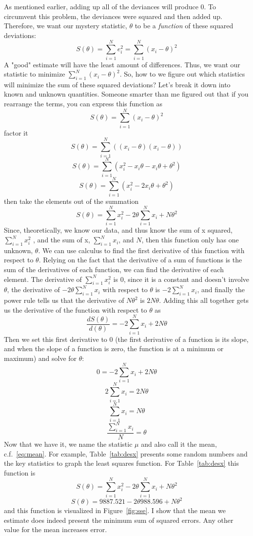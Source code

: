 As mentioned earlier, adding up all of the deviances will produce 0. To circumvent this problem, the deviances were squared and then added up. Therefore, we want our mystery statistic, $\theta$ to be a {\it function} of these squared deviations:
\begin{equation}
S\left(\theta\right)=\sum_{i=1}^{N}e_i^2=\sum_{i=1}^{N}\left(x_i-\theta\right)^2
\end{equation}
A "good" estimate will have the least amount of differences. Thus, we want our statistic to minimize $\sum_{i=1}^{N}\left(x_i-\theta\right)^2$. So, how to we figure out which statistics will minimize the sum of these squared deviations? Let's break it down into known and unknown quantities. Someone smarter than me figured out that if you rearrange the terms, you can express this function as
\[
S\left(\theta\right)=\sum_{i=1}^{N}\left(x_i-\theta\right)^2
\]
factor it
\[
S\left(\theta\right)=\sum_{i=1}^{N}\left(\left(x_i-\theta\right)\left(x_i-\theta\right)\right)
\]
\[
S\left(\theta\right)=\sum_{i=1}^{N}\left(x_i^2-x_i\theta-x_i\theta+\theta^2\right)
\]
\[
S\left(\theta\right)=\sum_{i=1}^{N}\left(x_i^2-2x_i\theta+\theta^2\right)
\]
then take the elements out of the summation
\begin{equation}
S\left(\theta\right)=\sum_{i=1}^{N}x_i^2-2\theta\sum_{i=1}^Nx_i+N\theta^2
\end{equation}
Since, theoretically, we know our data, and thus know the sum of x squared, $\sum_{i=1}^{N}x_i^2$ , and the sum of x, $\sum_{i=1}^{N}x_i$, and $N$, then this function only has one unknown, $\theta$. We can use calculus to find the first derivative of this function with respect to $\theta$. Relying on the fact that the derivative of a sum of functions is the sum of the derivatives of each function, we can find the derivative of each element. The derivative of $\sum_{i=1}^{N}x_i^2$ is 0, since it is a constant and doesn't involve $\theta$, the derivative of $-2\theta\sum_{i=1}^Nx_i$ with respect to $\theta$ is $-2\sum_{i=1}^Nx_i$, and finally the power rule tells us that the derivative of $N\theta^2$ is $2N\theta$. Adding this all together gets us the derivative of the function with respect to $\theta$ as
\begin{equation}
\frac{dS\left(\theta\right)}{d\left(\theta\right)}=-2\sum_{i=1}^{N}x_i+2N\theta
\end{equation}
Then we set this first derivative to 0 (the first derivative of a function is its slope, and when the slope of a function is zero, the function is at a minimum or maximum) and solve for $\theta$:
\[
0=-2\sum_{i=1}^{N}x_i+2N\theta
\]
\[
2\sum_{i=1}^{N}x_i=2N\theta
\]
\[
\sum_{i=1}^{N}x_i=N\theta
\]
\[
\frac{\sum_{i=1}^{N}x_i}{N}=\theta
\]
Now that we have it, we name the statistic $\mu$ and also call it the mean, c.f.~\eqref{eq:mean}. For example, Table~\ref{tab:desx} presents some random numbers and the key statistics to graph the least squares function. For Table~\ref{tab:desx} this function is
\[
S\left(\theta\right)=\sum_{i=1}^{N}x_i^2-2\theta\sum_{i=1}^{N}x_i+N\theta^2
\]
\[
S\left(\theta\right)=9887.521-2\theta 988.596+N\theta^2
\]
and this function is visualized in Figure~\ref{fig:sse}. I show that the mean we estimate does indeed present the minimum sum of squared errors. Any other value for the mean increases error.

